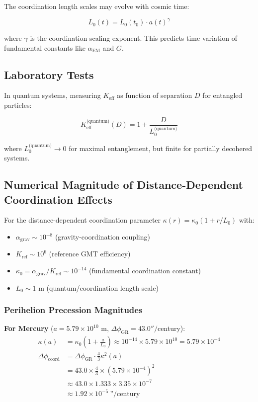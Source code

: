 \documentclass[11pt,a4paper]{article}
\begin{document}
The coordination length scales may evolve with cosmic time:

\begin{equation}
	L_0(t) = L_0(t_0) \cdot a(t)^\gamma
\end{equation}

where $\gamma$ is the coordination scaling exponent. This predicts 
time variation of fundamental constants like $\alpha_{\text{EM}}$ and $G$.

\subsection{Laboratory Tests}

In quantum systems, measuring $K_{\mathrm{eff}}$ as function of 
separation $D$ for entangled particles:

\begin{equation}
	K_{\mathrm{eff}}^{\text{(quantum)}}(D) = 1 + \frac{D}{L_0^{\text{(quantum)}}}
\end{equation}

where $L_0^{\text{(quantum)}} \to 0$ for maximal entanglement, but 
finite for partially decohered systems.

\subsection{Numerical Magnitude of Distance-Dependent Coordination Effects}
\label{subsec:numerical-magnitudes}

For the distance-dependent coordination parameter $\kappa(r) = \kappa_0(1 + r/L_0)$ with:
\begin{itemize}
	\item $\alpha_{\text{grav}} \sim 10^{-8}$ (gravity-coordination coupling)
	\item $K_{\text{ref}} \sim 10^6$ (reference GMT efficiency)
	\item $\kappa_0 = \alpha_{\text{grav}}/K_{\text{ref}} \sim 10^{-14}$ (fundamental coordination constant)
	\item $L_0 \sim 1$ m (quantum/coordination length scale)
\end{itemize}

\subsubsection{Perihelion Precession Magnitudes}

\textbf{For Mercury} ($a = 5.79 \times 10^{10}$ m, $\Delta\phi_{\text{GR}} = 43.0''/$century):
\begin{align}
	\kappa(a) &= \kappa_0 \left(1 + \frac{a}{L_0}\right) 
	\approx 10^{-14} \times 5.79 \times 10^{10} = 5.79 \times 10^{-4} \\
	\Delta\phi_{\text{coord}} &= \Delta\phi_{\text{GR}} \cdot \frac{4}{3} \kappa^2(a) \\
	&= 43.0 \times \frac{4}{3} \times (5.79 \times 10^{-4})^2 \\
	&\approx 43.0 \times 1.333 \times 3.35 \times 10^{-7} \\
	&\approx 1.92 \times 10^{-5} \ \text{''}/\text{century}
\end{align}
\end{document}
